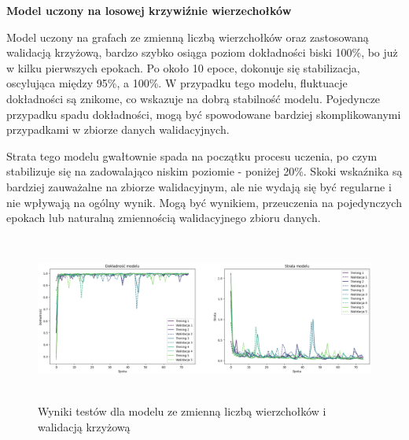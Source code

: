 


\textbf{Model uczony na losowej krzywiźnie wierzechołków}

Model uczony na grafach ze zmienną liczbą wierzchołków oraz zastosowaną walidacją krzyżową,
bardzo szybko osiąga poziom dokładności biski 100\%, bo już w kilku pierwszych epokach.
Po około 10 epoce, dokonuje się stabilizacja, oscylująca między 95\%, a 100\%.
W przypadku tego modelu, fluktuacje dokładności są znikome, co wskazuje na dobrą stabilność modelu.
Pojedyncze przypadku spadu dokładności, mogą być spowodowane bardziej skomplikowanymi
przypadkami w zbiorze danych walidacyjnych.

Strata tego modelu gwałtownie spada na początku procesu uczenia,
po czym stabilizuje się na zadowalająco niskim poziomie - poniżej 20\%.
Skoki wskaźnika są bardziej zauważalne na zbiorze walidacyjnym,
ale nie wydają się być regularne i nie wpływają na ogólny wynik.
Mogą być wynikiem, przeuczenia na pojedynczych epokach lub naturalną zmiennością walidacyjnego zbioru danych.

\begin{figure}[ht]
	\centering
	\includegraphics[height=5.5cm]{resources/tests/images/v3/multiple_edges_crossvalid_img.png}
	\caption{Wyniki testów dla modelu ze zmienną liczbą wierzchołków i walidacją krzyżową}
	\label{Fig:tests-csvar-1}
\end{figure}
\FloatBarrier

